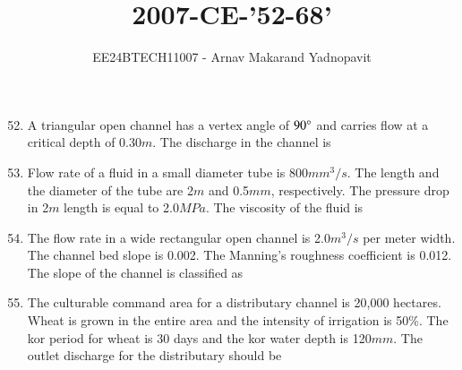 \documentclass[journal,12pt,onecolumn]{IEEEtran}
\theoremstyle{remark}
\begin{document}
\title{2007-CE-'52-68'}
\author{EE24BTECH11007 - Arnav Makarand Yadnopavit}
\maketitle
\renewcommand{\thefigure}{\theenumi}
\renewcommand{\thetable}{\theenumi}
\begin{enumerate}
\setcounter{enumi}{51}
\item A triangular open channel has a vertex angle of $90\degree$ and carries flow at a critical depth of 0.30$m$. The discharge in the channel is
\begin{enumerate}
\end{enumerate}
\item Flow rate of a fluid  in a small diameter tube is 800$mm^3/s$. The length and the diameter of the tube are 2$m$ and 0.5$mm$, respectively. The pressure drop in 2$m$ length is equal to 2.0$MPa$. The viscosity of the fluid is 
\begin{enumerate}
\end{enumerate}
\item The flow rate in a wide rectangular open channel is 2.0$m^3/s$ per meter width. The channel bed slope is 0.002. The Manning's roughness coefficient is 0.012. The slope of the channel is classified as
\begin{enumerate}
\end{enumerate}
\item The culturable command area for a distributary channel is 20,000 hectares. Wheat is grown in the entire area and the intensity of irrigation is 50\%. The kor period for wheat is 30 days and the kor water depth is 120$mm$. The outlet discharge for the distributary should be

\end{enumerate}
\end{document}
